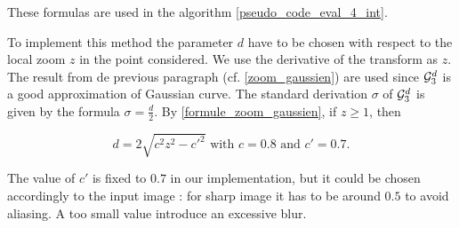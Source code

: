 These formulas are used in the algorithm \ref{pseudo_code_eval_4_int}.






\medbreak


To implement this method the parameter $d$ have to be chosen with respect to the local zoom $z$ in the point considered. We use the derivative of the transform as $z$.\\
The result from de previous paragraph (cf. \ref{zoom_gaussien}) are used since $\mathcal{G}_3^d$ is a good approximation of Gaussian curve. The standard derivation $\sigma$ of $\mathcal{G}_3^d$ is given by the formula $\sigma=\frac{d}{2}$. By \eqref{formule_zoom_gaussien}, if $z\ge 1$, then

\begin{equation*}
d=2\sqrt{c^2 z^2 - c'^2} \text{ with } c=0.8 \text{ and } c'=0.7.
\end{equation*}

The value of $c'$ is fixed to $0.7$ in our implementation, but it could be chosen accordingly to the input image : for sharp image it has to be around $0.5$ to avoid aliasing. A too small value introduce an excessive blur.



